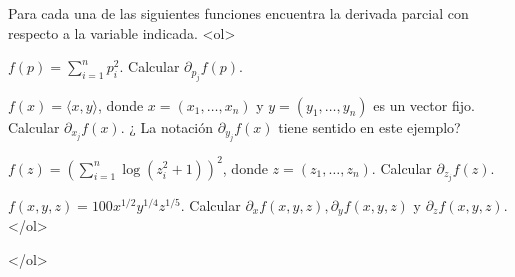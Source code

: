 \documentclass{article}
\theoremstyle{definition}
\begin{document}
         \item Para cada una de las siguientes funciones encuentra la derivada parcial con respecto a la variable indicada.
                <ol>
                \item $f(p)=\sum_{i=1}^n p_i^2$. Calcular $\partial_{p_j}f(p)$.
                \item $f(x)=\langle x, y \rangle$, donde $x=(x_1,\dots, x_n)$ y $y=(y_1,\dots, y_n)$
                  es un vector fijo. Calcular
                  $\partial_{x_j}f(x)$. ¿ La notación $\partial_{y_j}f(x)$ tiene sentido en este ejemplo?
                \item $f(z)=\left( \sum_{i=1}^n \log(z_i^2+1) \right)^2$,
                  donde $z=(z_1,\dots, z_n)$. Calcular $\partial_{z_j}f(z)$.
                \item $f(x,y,z)=100x^{1/2}y^{1/4}z^{1/5}$.
                  Calcular $\partial_xf(x,y,z), \partial_yf(x,y,z)$ y $\partial_zf(x,y,z)$.
                </ol>
       
                </ol>
   
       
\end{document}
